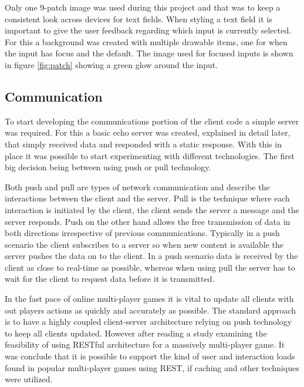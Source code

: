 Only one 9-patch image was used during this project and that was to keep a consistent look across devices for text fields. When styling a text field it is important to give the user feedback regarding which input is currently selected. For this a background was created with multiple drawable items, one for when the input has focus and the default. The image used for focused inputs is shown in figure \ref{fig:patch} showing a green glow around the input.

\subsection{Communication}
To start developing the communications portion of the client code a simple server was required. For this a basic echo server was created, explained in detail later, that simply received data and responded with a static response. With this in place it was possible to start experimenting with different technologies. The first big decision being between using push or pull technology.

Both push and pull are types of network communication and describe the interactions between the client and the server. Pull is the technique where each interaction is initiated by the client, the client sends the server a message and the server responds. Push on the other hand allows the free transmission of data in both directions irrespective of previous communications. Typically in a push scenario the client subscribes to a server so when new content is available the server pushes the data on to the client. In a push scenario data is received by the client as close to real-time as possible, whereas when using pull the server has to wait for the client to request data before it is transmitted.

In the fast pace of online multi-player games it is vital to update all clients with out players actions as quickly and accurately as possible. The standard approach is to have a highly coupled client-server architecture relying on push technology to keep all clients updated. However after reading a study\cite{6329833} examining the feasibility of using RESTful architecture for a massively multi-player game. It was conclude that it is possible to support the kind of user and interaction loads found in popular multi-player games using REST, if caching and other techniques were utilized.

